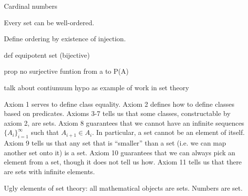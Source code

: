 \documentclass{article}
\begin{document}
Cardinal numbers

\begin{prop}
	Every set can be well-ordered.
\end{prop}

Define ordering by existence of injection.

def equipotent set (bijective)

prop no surjective funtion from a to P(A)

talk about contiunuum hypo as example of work in set theory


\begin{remark}
	Axiom 1 serves to define class equality. Axiom 2 defines how to define classes based on predicates. Axioms 3-7 tells us that some classes, constructable by axiom 2, are sets. Axiom 8 guarantees that we cannot have an infinite sequences $\{ A_i \}_{i=1}^\infty$ such that $A_{i+1} \in A_i$. In particular, a set cannot be an element of itself. Axiom 9 tells us that any set that is ``smaller'' than a set (i.e. we can map another set onto it) is a set. Axiom 10 guarantees that we can always pick an element from a set, though it does not tell us how. Axiom 11 tells us that there are sets with infinite elements.
\end{remark}

Ugly elements of set theory: all mathematical objects are sets. Numbers are set.


%
%
\end{document}
